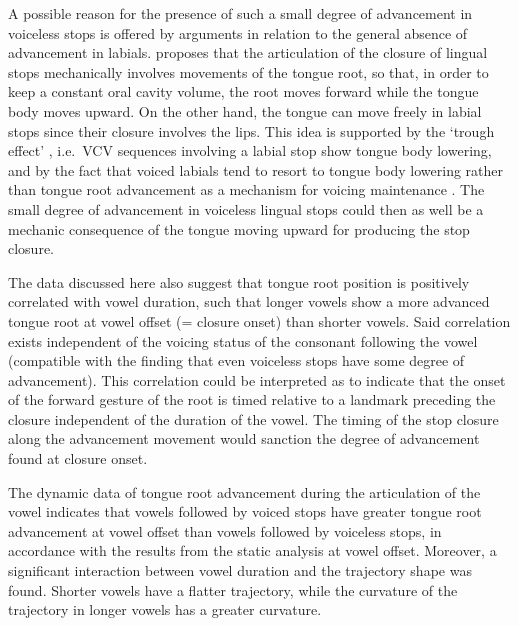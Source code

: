 \documentclass[12pt,]{article}
\begin{document}
A possible reason for the presence of such a small degree of advancement
in voiceless stops is offered by arguments in relation to the general
absence of advancement in labials. \citet{westbury1983} proposes that
the articulation of the closure of lingual stops mechanically involves
movements of the tongue root, so that, in order to keep a constant oral
cavity volume, the root moves forward while the tongue body moves
upward. On the other hand, the tongue can move freely in labial stops
since their closure involves the lips. This idea is supported by the
`trough effect' \citep{vazquez-alvarez2007}, i.e.~VCV sequences
involving a labial stop show tongue body lowering, and by the fact that
voiced labials tend to resort to tongue body lowering rather than tongue
root advancement as a mechanism for voicing maintenance
\citep{perkell1969, westbury1983, ahn2018}. The small degree of
advancement in voiceless lingual stops could then as well be a mechanic
consequence of the tongue moving upward for producing the stop closure.

The data discussed here also suggest that tongue root position is
positively correlated with vowel duration, such that longer vowels show
a more advanced tongue root at vowel offset (= closure onset) than
shorter vowels. Said correlation exists independent of the voicing
status of the consonant following the vowel (compatible with the finding
that even voiceless stops have some degree of advancement). This
correlation could be interpreted as to indicate that the onset of the
forward gesture of the root is timed relative to a landmark preceding
the closure independent of the duration of the vowel. The timing of the
stop closure along the advancement movement would sanction the degree of
advancement found at closure onset.

The dynamic data of tongue root advancement during the articulation of
the vowel indicates that vowels followed by voiced stops have greater
tongue root advancement at vowel offset than vowels followed by
voiceless stops, in accordance with the results from the static analysis
at vowel offset. Moreover, a significant interaction between vowel
duration and the trajectory shape was found. Shorter vowels have a
flatter trajectory, while the curvature of the trajectory in longer
vowels has a greater curvature.
\end{document}
